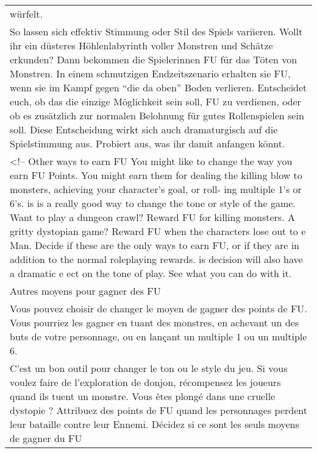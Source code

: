 \documentclass[]{article}
\begin{document}
\begin{longtable}[]{@{}l@{}}
\begin{minipage}[t]{0.05\columnwidth}
würfelt.
\strut\end{minipage}\tabularnewline
\begin{minipage}[t]{0.05\columnwidth}\raggedright\strut
So lassen sich effektiv Stimmung oder Stil des Spiels variieren. Wollt
ihr ein düsteres Höhlenlabyrinth voller Monstren und Schätze erkunden?
Dann bekommen die Spielerinnen FU für das Töten von Monstren. In einem
schmutzigen Endzeitszenario erhalten sie FU, wenn sie im Kampf gegen
``die da oben'' Boden verlieren. Entscheidet euch, ob das die einzige
Möglichkeit sein soll, FU zu verdienen, oder ob es zusätzlich zur
normalen Belohnung für gutes Rollenspielen sein soll. Diese Entscheidung
wirkt sich auch dramaturgisch auf die Spielstimmung aus. Probiert aus,
was ihr damit anfangen könnt.
\strut\end{minipage}\tabularnewline
\begin{minipage}[t]{0.05\columnwidth}\raggedright\strut
\textless{}!-- Other ways to earn FU You might like to change the way
you earn FU Points. You might earn them for dealing the killing blow to
monsters, achieving your character's goal, or roll- ing multiple 1's or
6's. is is a really good way to change the tone or style of the game.
Want to play a dungeon crawl? Reward FU for killing monsters. A gritty
dystopian game? Reward FU when the characters lose out to e Man. Decide
if these are the only ways to earn FU, or if they are in addition to the
normal roleplaying rewards. is decision will also have a dramatic e ect
on the tone of play. See what you can do with it.
\strut\end{minipage}\tabularnewline
\begin{minipage}[t]{0.05\columnwidth}\raggedright\strut
Autres moyens pour gagner des FU
\strut\end{minipage}\tabularnewline
\begin{minipage}[t]{0.05\columnwidth}\raggedright\strut
Vous pouvez choisir de changer le moyen de gagner des points de FU. Vous
pourriez les gagner en tuant des monstres, en achevant un des buts de
votre personnage, ou en lançant un multiple 1 ou un multiple 6.
\strut\end{minipage}\tabularnewline
\begin{minipage}[t]{0.05\columnwidth}\raggedright\strut
C'est un bon outil pour changer le ton ou le style du jeu. Si vous
voulez faire de l'exploration de donjon, récompensez les joueurs quand
ils tuent un monstre. Vous êtes plongé dans une cruelle dystopie ?
Attribuez des points de FU quand les personnages perdent leur bataille
contre leur Ennemi. Décidez si ce sont les seuls moyens de gagner du FU

\end{minipage}
\end{longtable}
\end{document}
